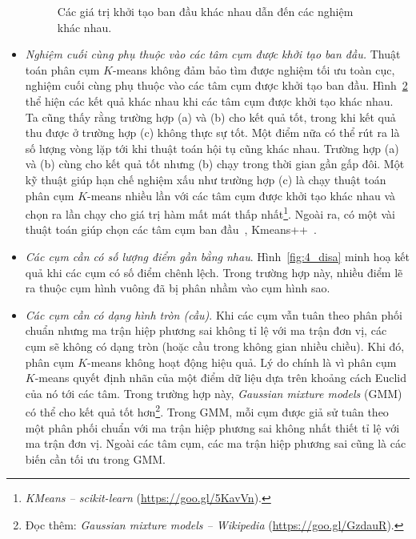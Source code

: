 \begin{itemize}
\begin{figure}[t]
\begin{subfigure}{0.325\textwidth}
        \caption{}
        \label{fig:4_dif_resc}
        \end{subfigure}
        \caption{
        Các giá trị khởi tạo ban đầu khác nhau dẫn đến các nghiệm khác nhau. 
        }
        \label{fig:4_dif_res}
    \end{figure}
    \item \textit{Nghiệm cuối cùng phụ thuộc vào các tâm cụm được khởi tạo ban
    đầu.}
    Thuật toán phân cụm $K$-means không đảm bảo tìm được nghiệm tối ưu toàn cục, nghiệm cuối cùng phụ thuộc vào các tâm cụm được khởi tạo ban đầu.
    Hình~\ref{fig:4_dif_res} thể hiện các kết quả khác nhau khi các tâm cụm
    được khởi tạo khác nhau. Ta cũng thấy rằng trường hợp (a) và (b) cho kết quả
    tốt, trong khi kết quả thu được ở trường hợp (c) không thực sự tốt. Một điểm
    nữa có thể rút ra là số lượng vòng lặp tới khi thuật toán hội tụ cũng khác
    nhau. Trường hợp (a) và (b) cùng cho kết quả tốt nhưng (b) chạy trong thời
    gian gần gấp đôi. Một kỹ thuật giúp hạn chế nghiệm xấu như trường hợp (c) là
    chạy thuật toán phân cụm $K$-means nhiều lần với các tâm cụm được khởi tạo
    khác nhau và chọn ra lần chạy cho giá trị hàm mất mát thấp nhất\footnote{\textit{KMeans -- scikit-learn} (\url{https://goo.gl/5KavVn}).}. Ngoài ra, có một vài thuật toán giúp chọn các tâm cụm ban đầu~\cite{khan2004cluster},
    Kmeans++~\cite{arthur2007k,bahmani2012scalable}.
  
    \item \textit{Các cụm cần có số lượng điểm gần bằng nhau}.
    Hình~\ref{fig:4_disa} minh hoạ kết quả khi các cụm có số điểm
    chênh lệch. Trong trường hợp này, nhiều điểm lẽ ra thuộc cụm hình vuông đã bị phân nhầm vào cụm hình sao. 

    \item \textit{Các cụm cần có dạng hình tròn (cầu)}.
    Khi các cụm vẫn tuân theo phân phối chuẩn nhưng ma trận hiệp phương sai
    không tỉ lệ với ma trận đơn vị, các cụm sẽ không có dạng tròn
    (hoặc cầu trong không gian nhiều chiều). Khi đó, phân cụm $K$-means không hoạt động hiệu quả. Lý do chính là vì phân cụm $K$-means quyết định
    nhãn của một điểm dữ liệu dựa trên khoảng cách Euclid của nó tới các
    tâm. Trong trường hợp này, \textit{Gaussian mixture models} (GMM)~\cite{reynolds2015gaussian} có thể cho kết quả tốt hơn\footnote{Đọc thêm:
    \textit{Gaussian mixture models -- Wikipedia} (\url{https://goo.gl/GzdauR}).}. Trong GMM, mỗi cụm được giả sử tuân theo một phân phối chuẩn với ma trận hiệp phương sai không nhất thiết tỉ lệ với ma trận đơn vị. Ngoài các tâm cụm, các ma trận hiệp phương sai cũng là các biến cần tối ưu trong GMM. 
    


\end{itemize}
